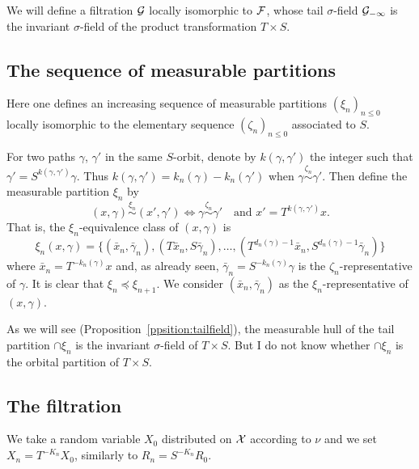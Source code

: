 \documentclass[12pt,a4paper]{article}
\begin{document}
We will define a filtration $\mathcal{G}$ locally isomorphic to $\mathcal{F}$, whose 
tail $\sigma$-field $\mathcal{G}_{-\infty}$ is the invariant $\sigma$-field of 
the product transformation $T \times S$. 


\subsection{The sequence of measurable partitions}

Here one defines an increasing sequence of measurable partitions ${(\xi_n)}_{n \leq 0}$ 
locally isomorphic to the elementary sequence ${(\zeta_n)}_{n \leq 0}$ associated to $S$. 

For two paths $\gamma$, $\gamma'$ in the same $S$-orbit, denote by $k(\gamma,\gamma')$ 
the integer such that $\gamma'=S^{k(\gamma,\gamma')}\gamma$. 
Thus $k(\gamma,\gamma') = k_n(\gamma)-k_n(\gamma')$ when $\gamma \overset{\zeta_n}{\sim} \gamma'$. 
Then define the measurable partition $\xi_n$ by 
$$
\boxed{(x, \gamma) \overset{\xi_n}{\sim} (x', \gamma') \iff 
\gamma \overset{\zeta_n}{\sim} \gamma' \quad 
\text{and $x'=T^{k(\gamma,\gamma')}x$}}. 
$$
That is, the $\xi_n$-equivalence class of $(x,\gamma)$ is 
$$
\boxed{\xi_n(x,\gamma) = \bigl\{(\bar x_n, \bar\gamma_n), (T\bar x_n, S\bar\gamma_n), 
\ldots, (T^{d_n(\gamma)-1}\bar x_n, S^{d_n(\gamma)-1}\bar\gamma_n) \bigr\}}
$$
where $\bar x_n = T^{-k_n(\gamma)}x$ and, as already seen, 
$\bar\gamma_n = S^{-k_n(\gamma)}\gamma$ is the $\zeta_n$-representative of 
$\gamma$. 
It is clear that $\xi_n \preceq \xi_{n+1}$. 
We  consider $(\bar x_n, \bar\gamma_n)$ as the $\xi_n$-representative of
$(x,\gamma)$. 

\begin{remark}
As we will see (Proposition~\ref{ppsition:tailfield}), 
the measurable hull of the tail partition $\cap \xi_n$ is 
the invariant $\sigma$-field of $T \times S$. 
But I do not know whether $\cap \xi_n$ 
is the orbital partition of $T \times S$.
\end{remark}

\subsection{The filtration} 



We take a random variable $X_0$ distributed on $\mathcal{X}$ according to $\nu$ 
and we set $\boxed{X_n = T^{-K_n} X_0}$, similarly to $R_n = S^{-K_n} R_0$. 
\end{document}
